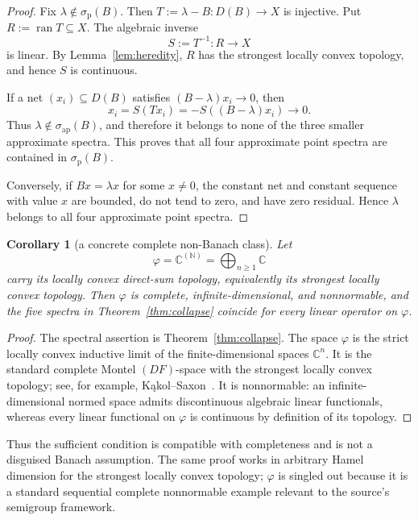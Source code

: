 \documentclass[11pt]{article}
\newtheorem{corollary}{Corollary}
\newcommand{\C}{\mathbb C}
\newcommand{\N}{\mathbb N}
\newcommand{\sap}{\sigma_{\mathrm{ap}}}
\newcommand{\spoint}{\sigma_{\mathrm p}}
\begin{document}
\begin{proof}
Fix $\lambda\notin\spoint(B)$.  Then
$T:=\lambda-B\colon D(B)\to X$ is injective.  Put
$R:=\operatorname{ran}T\subseteq X$.  The algebraic inverse
\[
 S:=T^{-1}\colon R\longrightarrow X
\]
is linear.  By Lemma~\ref{lem:heredity}, $R$ has the strongest locally convex
topology, and hence $S$ is continuous.

If a net $(x_i)\subseteq D(B)$ satisfies $(B-\lambda)x_i\to0$, then
\[
 x_i=S(Tx_i)=-S((B-\lambda)x_i)\longrightarrow0.
\]
Thus $\lambda\notin\sap(B)$, and therefore it belongs to none of the three
smaller approximate spectra.  This proves that all four approximate point
spectra are contained in $\spoint(B)$.

Conversely, if $Bx=\lambda x$ for some $x\ne0$, the constant net and constant
sequence with value $x$ are bounded, do not tend to zero, and have zero
residual.  Hence $\lambda$ belongs to all four approximate point spectra.
\end{proof}

\begin{corollary}[a concrete complete non-Banach class]\label{cor:phi}
Let
\[
 \varphi=\C^{(\N)}=\bigoplus_{n\geq1}\C
\]
carry its locally convex direct-sum topology, equivalently its strongest
locally convex topology.  Then $\varphi$ is complete, infinite-dimensional,
and nonnormable, and the five spectra in Theorem~\ref{thm:collapse} coincide
for every linear operator on $\varphi$.
\end{corollary}

\begin{proof}
The spectral assertion is Theorem~\ref{thm:collapse}.  The space $\varphi$ is
the strict locally convex inductive limit of the finite-dimensional spaces
$\C^n$.  It is the standard complete Montel $(DF)$-space with the strongest
locally convex topology; see, for example, K\k{a}kol--Saxon~\cite{KakolSaxon}.
It is nonnormable: an infinite-dimensional normed space admits discontinuous
algebraic linear functionals, whereas every linear functional on $\varphi$ is
continuous by definition of its topology.
\end{proof}

Thus the sufficient condition is compatible with completeness and is not a
disguised Banach assumption.  The same proof works in arbitrary Hamel
dimension for the strongest locally convex topology; $\varphi$ is singled out
because it is a standard sequential complete nonnormable example relevant to
the source's semigroup framework.
\end{document}
